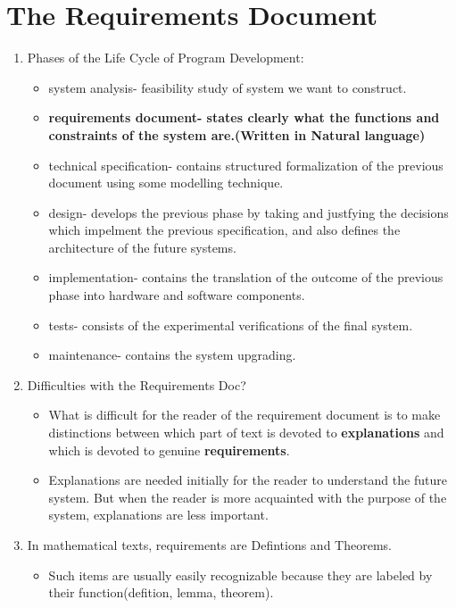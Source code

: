 \documentclass{article}
\begin{document}
  \tableofcontents
  \newpage
  
  \section{The Requirements Document}
  \begin{enumerate}
      \item Phases of the Life Cycle of Program Development:\begin{itemize}
          \item system analysis- feasibility study of system we want to construct.
          \item \textbf{requirements document- states clearly what the functions and constraints of the system are.(Written in Natural language)}
          \item technical specification- contains structured formalization of the previous document using some modelling technique.
          \item design- develops the previous phase by taking and justfying the decisions which impelment the previous specification, and 
          also defines the architecture of the future systems.
          \item implementation- contains the translation of the outcome of the previous phase into hardware and software components.
          \item tests- consists of the experimental verifications of the final system.
          \item maintenance- contains the system upgrading.
      \end{itemize}
      \item Difficulties with the Requirements Doc?\begin{itemize}
        \item What is difficult for the reader of the requirement document is to make distinctions between which part of text
        is devoted to \textbf{explanations} and which is devoted to genuine \textbf{requirements}.
        \item Explanations are needed initially for the reader to
        understand the future system. But when the reader is more acquainted
        with the purpose of the system, explanations are less important.
      \end{itemize}
      \item In mathematical texts, requirements are Defintions and Theorems. \begin{itemize}
        \item Such items are usually easily recognizable because they are labeled by their function(defition, lemma, theorem).

\end{itemize}
\end{enumerate}
\end{document}
